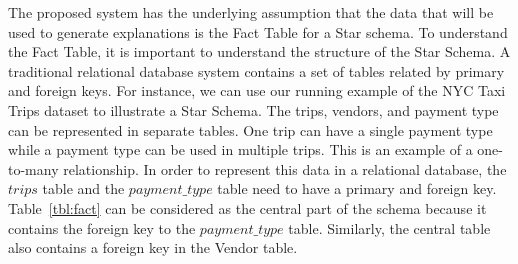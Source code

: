 The proposed system has the underlying assumption that the data that will be used to generate explanations is the Fact Table for a Star schema\cite{giovinazzo2000object,adamson2010star}. To understand the Fact Table, it is important to understand the structure of the Star Schema. A traditional relational database system contains a set of tables related by primary and foreign keys. For instance, we can use our running example of the NYC Taxi Trips dataset to illustrate a Star Schema. The trips, vendors, and payment type can be represented in separate tables. One trip can have a single payment type while a payment type can be used in multiple trips. This is an example of a one-to-many relationship. 
In order to represent this data in a relational database, the $trips$ table and the $payment\_type$ table need to have a primary and foreign key. Table~\ref{tbl:fact} can be considered as the central part of the schema because it contains the foreign key to the $payment\_type$ table. Similarly, the central table also contains a foreign key in the Vendor table.





